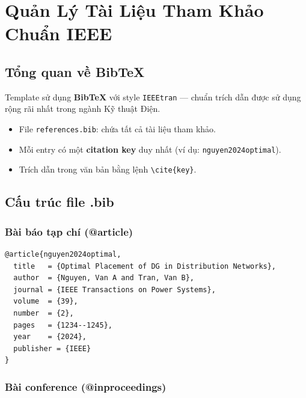 
\chapter{Quản Lý Tài Liệu Tham Khảo Chuẩn IEEE}
\label{ch:references}

\section{Tổng quan về BibTeX}

Template sử dụng \textbf{BibTeX} với style \texttt{IEEEtran} --- chuẩn trích dẫn được sử dụng rộng rãi nhất trong ngành Kỹ thuật Điện.

\begin{itemize}
  \item File \texttt{references.bib}: chứa tất cả tài liệu tham khảo.
  \item Mỗi entry có một \textbf{citation key} duy nhất (ví dụ: \texttt{nguyen2024optimal}).
  \item Trích dẫn trong văn bản bằng lệnh \verb|\cite{key}|.
\end{itemize}

\section{Cấu trúc file .bib}

\subsection{Bài báo tạp chí (@article)}

\begin{lstlisting}[style=latexstyle, caption={Entry @article mẫu}]
@article{nguyen2024optimal,
  title   = {Optimal Placement of DG in Distribution Networks},
  author  = {Nguyen, Van A and Tran, Van B},
  journal = {IEEE Transactions on Power Systems},
  volume  = {39},
  number  = {2},
  pages   = {1234--1245},
  year    = {2024},
  publisher = {IEEE}
}
\end{lstlisting}

\subsection{Bài conference (@inproceedings)}

